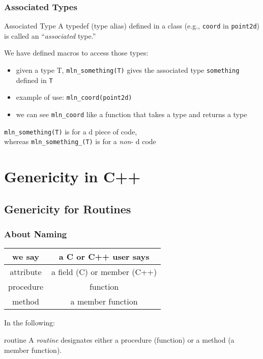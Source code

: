 \documentclass{beamer}
\newcommand{\cpp}{{C++}\xspace}
\newcommand{\kw}[1]{{\color{blue}{\texttt{#1}}}\xspace}
\newcommand{\code}[1]{{\scriptsize{\texttt{#1}}}\xspace}
\begin{document}
\begin{frame}
  \frametitle{Associated Types}

\begin{block}{Associated Type}
  A typedef (type alias) defined in a class (e.g., \code{coord} in
  \code{point2d}) is called an ``\emph{associated} type.''
\end{block}

\smallskip
We have defined macros to access those types:
\begin{itemize}
\item given a type T, \code{mln\_something(T)} gives the associated
  type \code{something} defined in \code{T}
\item example of use: \code{mln\_coord(point2d)}
\item we can see \code{mln\_coord} like a function that takes a type and returns a type
\end{itemize}

\smallskip

\tiny{\code{mln\_something(T)} is for a \kw{template}d piece of
  code,\\ whereas \code{mln\_something\_(T)} is for a
  \emph{non}-\kw{template}d code}

\end{frame}



\section{Genericity in \cpp}


\subsection{Genericity for Routines}


\begin{frame}
  \frametitle{About Naming}

  \begin{center}
    \begin{tabular}{|c|c|}
      \hline
      we say & a C or \cpp user says \\
      \hline \hline 
      attribute & a field (C) or member (\cpp) \\
      procedure & function \\
      method & a member function \\
      \hline 
    \end{tabular}
  \end{center}

\smallskip

In the following:
\begin{block}{routine}
  A \emph{routine} designates either a procedure (function) or a
  method (a member function).
\end{block}

\end{frame}
\end{document}
